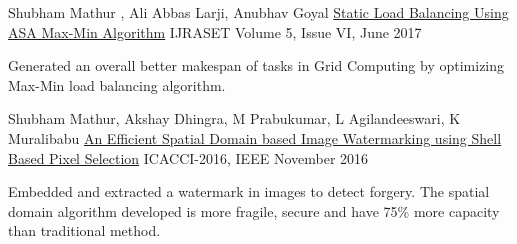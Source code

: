 \vspace{-0.5mm}
\begin{cventries}
  \cventry
    {Shubham Mathur , Ali Abbas Larji, Anubhav Goyal}
    {\href{http://www.ijraset.com/fileserve.php?FID=8525}{\color{darkred}
    Static Load Balancing Using ASA Max-Min Algorithm}}
    {IJRASET}
    { Volume 5, Issue VI, June 2017}
    {  \begin{justify}
        {\vspace{-4.5mm}
        \small Generated an overall better makespan of tasks in Grid Computing by optimizing Max-Min load balancing algorithm.
        }\end{justify}
    }
  \cventry
    {Shubham Mathur, Akshay Dhingra, M Prabukumar, L Agilandeeswari, K Muralibabu}
    {\href{http://ieeexplore.ieee.org/document/7732468/}{\color{darkred}
    An Efficient Spatial Domain based Image Watermarking using Shell Based Pixel Selection} }
    {ICACCI-2016, IEEE}
    {November 2016}
    {\begin{justify}
      {\vspace{-2mm}
      \small Embedded and extracted a watermark in images to detect forgery. The spatial domain algorithm developed is more fragile, secure and have 75\% more capacity than traditional method.
      }\end{justify}
    }     
\end{cventries}
